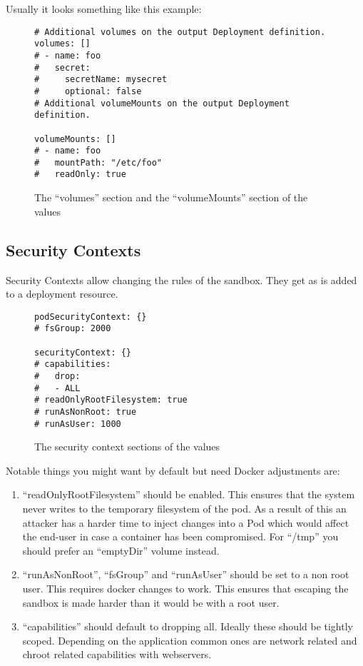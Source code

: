 Usually it looks something like this example:
\begin{figure}[h]
\begin{verbatim}
# Additional volumes on the output Deployment definition.
volumes: []
# - name: foo
#   secret:
#     secretName: mysecret
#     optional: false
# Additional volumeMounts on the output Deployment definition.

volumeMounts: []
# - name: foo
#   mountPath: "/etc/foo"
#   readOnly: true
\end{verbatim}
\caption{The \enquote{volumes} section and the \enquote{volumeMounts} section of the \gls{values}}\label{code:volumes_section}
\end{figure}

\subsection{Security Contexts}
Security Contexts allow changing the rules of the sandbox.
They get as is added to a \Gls{deployment resource}.

\begin{figure}[h]
\begin{verbatim}
podSecurityContext: {}
# fsGroup: 2000

securityContext: {}
# capabilities:
#   drop:
#   - ALL
# readOnlyRootFilesystem: true
# runAsNonRoot: true
# runAsUser: 1000
\end{verbatim}
\caption{The security context sections of the \gls{values}}\label{code:security_section}
\end{figure}

Notable things you might want by default but need Docker adjustments are:

\begin{enumerate}
	\item{
		\enquote{readOnlyRootFilesystem} should be enabled.
		This ensures that the system never writes to the temporary filesystem of the pod.
		As a result of this an attacker has a harder time to inject changes into a Pod which would affect the end-user in case a container has been compromised.
		For \enquote{/tmp} you should prefer an \enquote{emptyDir} volume instead.
	}
	\item{
		\enquote{runAsNonRoot}, \enquote{fsGroup} and \enquote{runAsUser} should be set to a non root user.
		This requires docker changes to work.
		This ensures that escaping the sandbox is made harder than it would be with a root user.
	}
	\item{
		\enquote{capabilities} should default to dropping all.
		Ideally these should be tightly scoped.
		Depending on the application common ones are network related and chroot related capabilities with webservers.
	}
\end{enumerate}

